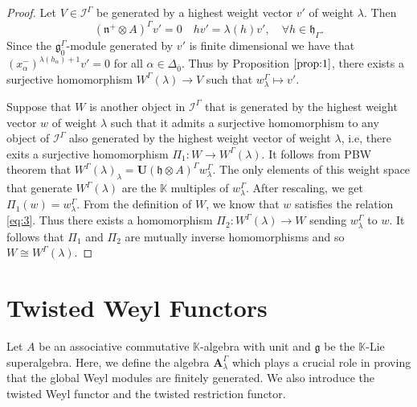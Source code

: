 \documentclass[11pt]{amsart}
\theoremstyle{plain}
\theoremstyle{definition}
\newcommand{\g}{\mathfrak{g}}
\newcommand{\h}{\mathfrak{h}}
\newcommand{\n}{\mathfrak{n}}
\newcommand{\A}{\mathbf{A}_{\lambda}^{\Gamma}}
\begin{document}
\begin{proof}
Let $V\in\mathcal{I}^\Gamma$ be generated by a highest weight vector $v'$ of weight $\lambda$. Then
    \begin{equation*}
        (\n^+\otimes A)^{\Gamma}v'=0 \quad hv'=\lambda(h)v', \quad \forall h\in\h_{\Gamma}.
    \end{equation*}
 Since the $\g_{\bar{0}}^{\Gamma}$-module generated by $v'$ is finite dimensional we have that $(x_{\alpha}^{-})^{\lambda(h_\alpha)+1}v'=0$ for all $\alpha\in\Delta_{\bar{0}}$. Thus by Proposition $\ref{prop:1}$, there exists a surjective homomorphism $W^\Gamma(\lambda)\longrightarrow V$ such that $w^{\Gamma}_{\lambda}\mapsto v'$.
    
Suppose that $W$ is another object in $\mathcal{I}^\Gamma$ that is generated by the highest weight vector $w$ of weight $\lambda$ such that it admits a surjective homomorphism to any object of $\mathcal{I}^\Gamma$ also generated by the highest weight vector of weight $\lambda$, i.e, there exits a surjective homomorphism $\Pi_1:W\longrightarrow W^\Gamma(\lambda)$. It follows from PBW theorem that $W^\Gamma(\lambda)_\lambda=\mathbf{U}(\h\otimes A)^\Gamma w^{\Gamma}_{\lambda}$. The only elements of this weight space that generate $W^\Gamma(\lambda)$ are the $\mathbb{K}$ multiples of $w^{\Gamma}_{\lambda}$. After rescaling, we get $\Pi_1(w)=w^{\Gamma}_{\lambda}$. From the definition of $W$, we know that $w$ satisfies the relation \eqref{eq:3}. Thus there exists a homomorphism $\Pi_2:W^\Gamma(\lambda)\longrightarrow W$ sending $w^{\Gamma}_{\lambda}$ to $w$. It follows that $\Pi_1$ and $\Pi_2$ are mutually inverse homomorphisms and so $W\cong W^\Gamma(\lambda)$.
\end{proof}
\section{Twisted Weyl Functors}\label{sec:6}
Let $A$ be an associative commutative $\mathbb{K}$-algebra with unit and $\g$ be the $\mathbb{K}$-Lie superalgebra. Here, we define the algebra $\A$  which plays a crucial role in proving that the global Weyl modules are finitely generated. We also introduce the twisted Weyl functor and the twisted restriction functor.
\end{document}
